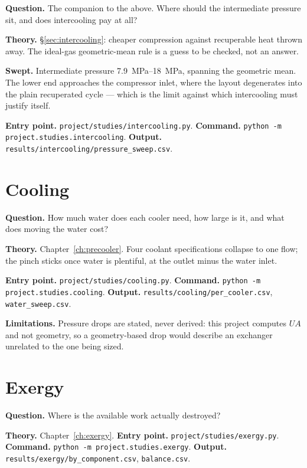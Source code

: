 \documentclass[11pt,a4paper]{report}
\newcommand{\code}[1]{\texttt{\small #1}}
\begin{document}
\textbf{Question.} The companion to the above. Where should the
intermediate pressure sit, and does intercooling pay at all?

\textbf{Theory.} \S\ref{sec:intercooling}: cheaper compression against
recuperable heat thrown away. The ideal-gas geometric-mean rule is a
guess to be checked, not an answer.

\textbf{Swept.} Intermediate pressure \SIrange{7.9}{18}{\mega\pascal},
spanning the geometric mean. The lower end approaches the compressor
inlet, where the layout degenerates into the plain recuperated cycle ---
which is the limit against which intercooling must justify itself.

\textbf{Entry point.} \code{project/studies/intercooling.py}.
\textbf{Command.} \code{python -m project.studies.intercooling}.
\textbf{Output.} \code{results/intercooling/pressure\_sweep.csv}.

\section{Cooling}

\textbf{Question.} How much water does each cooler need, how large is
it, and what does moving the water cost?

\textbf{Theory.} Chapter~\ref{ch:precooler}. Four coolant specifications
collapse to one flow; the pinch sticks once water is plentiful, at the
 outlet minus the water inlet.

\textbf{Entry point.} \code{project/studies/cooling.py}.
\textbf{Command.} \code{python -m project.studies.cooling}.
\textbf{Output.} \code{results/cooling/per\_cooler.csv},
\code{water\_sweep.csv}.

\textbf{Limitations.} Pressure drops are stated, never derived: this
project computes $UA$ and not geometry, so a geometry-based drop would
describe an exchanger unrelated to the one being sized.

\section{Exergy}

\textbf{Question.} Where is the available work actually destroyed?

\textbf{Theory.} Chapter~\ref{ch:exergy}.
\textbf{Entry point.} \code{project/studies/exergy.py}.
\textbf{Command.} \code{python -m project.studies.exergy}.
\textbf{Output.} \code{results/exergy/by\_component.csv},
\code{balance.csv}.
\end{document}
